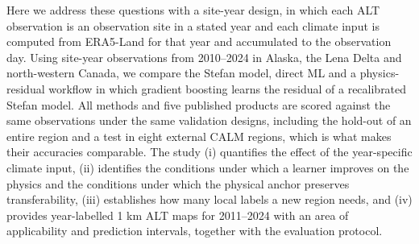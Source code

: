 Here we address these questions with a site-year design, in which each ALT observation is an observation site in a stated year and each climate input is computed from ERA5-Land for that year and accumulated to the observation day\cite{munozsabater2021_era5_land}. Using \nncyAll{} site-year observations from 2010--2024 in Alaska, the Lena Delta and north-western Canada, we compare the Stefan model, direct ML and a physics-residual workflow in which gradient boosting learns the residual of a recalibrated Stefan model. All methods and five published products are scored against the same observations under the same validation designs, including the hold-out of an entire region and a test in eight external CALM regions, which is what makes their accuracies comparable. The study (i) quantifies the effect of the year-specific climate input, (ii) identifies the conditions under which a learner improves on the physics and the conditions under which the physical anchor preserves transferability, (iii) establishes how many local labels a new region needs, and (iv) provides year-labelled 1 km ALT maps for 2011--2024 with an area of applicability and prediction intervals, together with the evaluation protocol.
